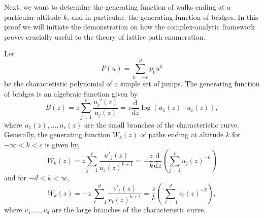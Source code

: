 Next, we want to determine the generating function of walks ending at a particular altitude $k$, and in particular, the generating function of bridges. In this proof we will initiate the demonstration on how the complex-analytic framework proves crucially useful to the theory of lattice path enumeration.

\begin{theorem}
  \label{thm:gf_bridges}
  Let 
  $$
    P(u) = \sum_{k = -c}^d p_k u^k
  $$ 
  be the characteristic polynomial of a simple set of jumps.
  The generating function of bridges is an algebraic function given by 
  \begin{equation*}
    B(z) = z\sum_{j=1}^c\frac{u_j'(z)}{u_j(z)} = z \frac{\mathrm{d}}{\mathrm{d}z} \log(u_1(z)\cdots u_c(z)),
  \end{equation*}
  where $u_1(z),\dots,u_c(z)$ are the small branches of the characteristic curve.
  Generally, the generating function $W_k(z)$ of paths ending at altitude $k$ for $-\infty < k < c$ is given by,
  \begin{equation*}
    W_k(z) = z\sum_{j=1}^c \frac{u'_j(z)}{u_j(z)^{k+1}} = 
    -\frac{z}{k} \frac{\mathrm{d}}{\mathrm{d}z}
    \left(
      \sum_{j=1}^c u_j(z)^{-k}
    \right)
  \end{equation*}
  and for $-d < k < \infty$,
  \begin{equation} \label{eq:Wk2}
    W_k(z) = -z\sum_{\ell=1}^d \frac{v'_\ell(z)}{v_\ell(z)^{k+1}} = \frac{z}{k}\left(\sum_{\ell=1}^d v_\ell(z)^{-k}\right),
  \end{equation}
  where $v_1, \dots, v_d$ are the large branches of the characteristic curve.
\end{theorem}


